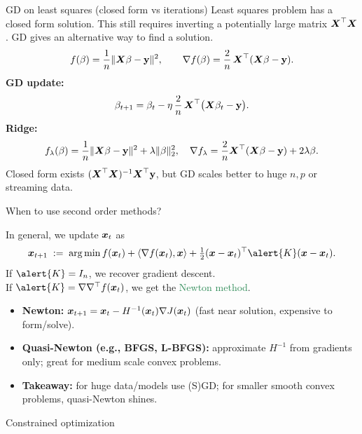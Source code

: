 \documentclass{beamer}
\begin{document}
\begin{frame}{GD on least squares (closed form vs iterations)}
Least squares problem has a closed form solution. This still requires inverting a potentially large matrix $\boldsymbol X^\top \boldsymbol X$. GD gives an alternative  way to find a solution. 
\[
f(\beta)=\frac{1}{n}\|\boldsymbol X\beta-{\bf y}\|^2,\qquad
\nabla f(\beta)=\frac{2}{n}\,\boldsymbol X^{\top}(\boldsymbol X\beta-{\bf y}).
\]
\textbf{GD update:}
\[
\beta_{t+1}=\beta_t-\eta\,\frac{2}{n}\,\boldsymbol X^{\top}\big(\boldsymbol X\beta_t-{\bf y}\big).
\]
\textbf{Ridge:}
\[
f_{\lambda}(\beta)=\frac{1}{n}\|\boldsymbol X\beta-{\bf y}\|^2+\lambda\|\beta\|_2^2,\quad
\nabla f_{\lambda}=\frac{2}{n}\boldsymbol X^{\top}(\boldsymbol X\beta-{\bf y})+2\lambda\beta.
\]
{\footnotesize Closed form exists \((\boldsymbol X^{\top}\boldsymbol X)^{-1}\boldsymbol X^{\top}{\bf y}\), but GD scales better to huge \(n,p\) or streaming data.}
\end{frame}

\begin{frame}{When to use second order methods?}

In general, we update $\boldsymbol x_t$ as
$$
\bs x_{t+1}\;:=\;\arg\min f(\bs x_t)+\<\nabla f(\bs x_t),\bs x\>+\tfrac12 (\bs x-\bs x_t)^\top \alert{K} (\bs x-\bs x_t).
$$
If $\alert{K}=I_n$, we recover gradient descent. \\[2mm]
If $\alert{K}=\nabla\nabla^\top f(\bs x_t)$, we get the \textcolor{SeaGreen}{Newton method}. \\[2mm]


\begin{itemize}
\item \textbf{Newton:} \(\boldsymbol x_{t+1}=\boldsymbol x_t-H^{-1}(\boldsymbol x_t)\nabla J(\boldsymbol x_t)\) (fast near solution, expensive to form/solve).
\item \textbf{Quasi-Newton (e.g., BFGS, L\!-\!BFGS):} approximate \(H^{-1}\) from gradients only; great for medium scale convex problems.
\item \textbf{Takeaway:} for huge data/models use (S)GD; for smaller smooth convex problems, quasi-Newton shines.
\end{itemize}

\end{frame}


\begin{frame} \begin{center}
	\alert{\Huge Constrained optimization}
\end{center}\end{frame}
\end{document}
